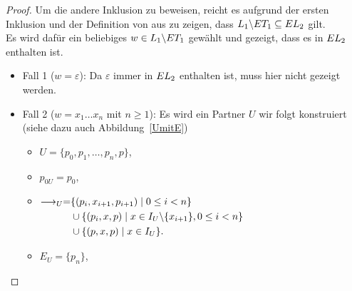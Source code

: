 \begin{proof}
  Um die andere Inklusion zu beweisen, reicht es aufgrund der ersten
  Inklusion und der Definition von \EL{} aus zu zeigen, dass $L_1\backslash ET
  _1\subseteq EL _2$ gilt.\\
  Es wird dafür ein beliebiges $w\in L_1\backslash ET _1$ gewählt und gezeigt,
  dass es in $EL _2$ enthalten ist.
  \begin{itemize}
    \item Fall 1 ($w=\varepsilon$): Da $\varepsilon$ immer in $EL _2$
      enthalten ist, muss hier nicht gezeigt werden.
    \item Fall 2 ($w=x_1\dots x_n$ mit $n\geq 1$): Es wird ein Partner $U$ wir
      folgt konstruiert (siehe dazu auch Abbildung~\ref{UmitE})
      \begin{itemize}
        \item $U=\{p_0,p_1,\dots ,p_n,p\}$,
        \item $p_{0U}=p_0$,
        \item $\begin{aligned}[t]
            \must _U=&\{(p_i,x_{i+1},p_{i+1})\mid 0\leq i< n\}\\
            &\cup\{(p_i,x,p)\mid x\in I_U\backslash\{x_{i+1}\},0\leq i< n\}\\
            &\cup\{(p,x,p)\mid x\in I_U\}.
        \end{aligned}$
        \item $E_U=\{p_n\}$,
      \end{itemize}
      \begin{figure} [h!tbp]
      \begin{center}
\end{center}
\end{figure}
\end{itemize}
\end{proof}
